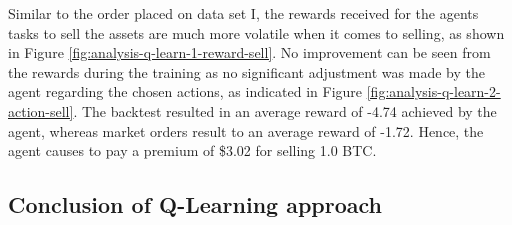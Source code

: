 Similar to the order placed on data set I, the rewards received for the agents tasks to sell the assets are much more volatile when it comes to selling, as shown in Figure \ref{fig:analysis-q-learn-1-reward-sell}.
No improvement can be seen from the rewards during the training as no significant adjustment was made by the agent regarding the chosen actions, as indicated in Figure \ref{fig:analysis-q-learn-2-action-sell}.
The backtest resulted in an average reward of -4.74 achieved by the agent, whereas market orders result to an average reward of -1.72.
Hence, the agent causes to pay a premium of \$3.02 for selling 1.0 BTC.

\subsection{Conclusion of Q-Learning approach}

